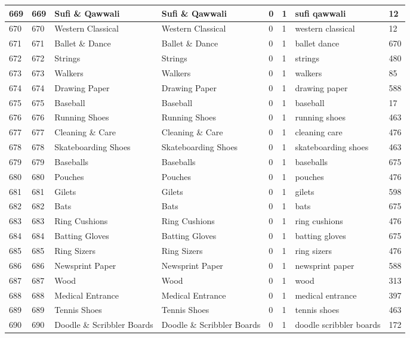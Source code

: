 \begin{longtable}{|l|l|l|l|l|l|l|l|}
669 & 669 & Sufi \& Qawwali & Sufi \& Qawwali & 0 & 1 & sufi qawwali & 12 \\ \hline 
670 & 670 & Western Classical & Western Classical & 0 & 1 & western classical & 12 \\ \hline 
671 & 671 & Ballet \& Dance & Ballet \& Dance & 0 & 1 & ballet dance & 670 \\ \hline 
672 & 672 & Strings & Strings & 0 & 1 & strings & 480 \\ \hline 
673 & 673 & Walkers & Walkers & 0 & 1 & walkers & 85 \\ \hline 
674 & 674 & Drawing Paper & Drawing Paper & 0 & 1 & drawing paper & 588 \\ \hline 
675 & 675 & Baseball & Baseball & 0 & 1 & baseball & 17 \\ \hline 
676 & 676 & Running Shoes & Running Shoes & 0 & 1 & running shoes & 463 \\ \hline 
677 & 677 & Cleaning \& Care & Cleaning \& Care & 0 & 1 & cleaning care & 476 \\ \hline 
678 & 678 & Skateboarding Shoes & Skateboarding Shoes & 0 & 1 & skateboarding shoes & 463 \\ \hline 
679 & 679 & Baseballs & Baseballs & 0 & 1 & baseballs & 675 \\ \hline 
680 & 680 & Pouches & Pouches & 0 & 1 & pouches & 476 \\ \hline 
681 & 681 & Gilets & Gilets & 0 & 1 & gilets & 598 \\ \hline 
682 & 682 & Bats & Bats & 0 & 1 & bats & 675 \\ \hline 
683 & 683 & Ring Cushions & Ring Cushions & 0 & 1 & ring cushions & 476 \\ \hline 
684 & 684 & Batting Gloves & Batting Gloves & 0 & 1 & batting gloves & 675 \\ \hline 
685 & 685 & Ring Sizers & Ring Sizers & 0 & 1 & ring sizers & 476 \\ \hline 
686 & 686 & Newsprint Paper & Newsprint Paper & 0 & 1 & newsprint paper & 588 \\ \hline 
687 & 687 & Wood & Wood & 0 & 1 & wood & 313 \\ \hline 
688 & 688 & Medical Entrance & Medical Entrance & 0 & 1 & medical entrance & 397 \\ \hline 
689 & 689 & Tennis Shoes & Tennis Shoes & 0 & 1 & tennis shoes & 463 \\ \hline 
690 & 690 & Doodle \& Scribbler Boards & Doodle \& Scribbler Boards & 0 & 1 & doodle scribbler boards & 172 \\ \hline 

\end{longtable}
